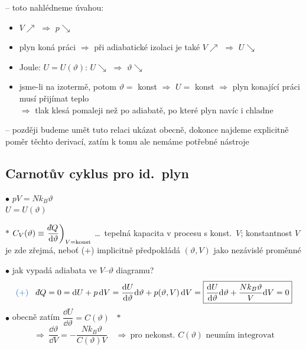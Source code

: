 -- toto nahlédneme úvahou: \quad {}
\begin{itemize}[nosep]
  \item $V\nearrow$ $\Rightarrow$ $p\searrow$
  \item plyn koná práci $\Rightarrow$ při adiabatické izolaci je také $V\nearrow$ $\Rightarrow$ $U\searrow$
  \item Joule: $U = U(\vartheta)$: \quad $U\searrow$ $\Rightarrow$ $\vartheta\searrow$
  \item jsme-li na izotermě, potom $\vartheta = $ konst $\Rightarrow$ $U = $ konst $\Rightarrow$ plyn konající práci musí přijímat teplo \\
        $\Rightarrow$ tlak klesá pomaleji než po adiabatě, po které plyn navíc i chladne
\end{itemize}
-- později budeme umět tuto relaci ukázat obecně, dokonce najdeme explicitně poměr těchto derivací, zatím k tomu ale nemáme potřebné nástroje

\subsection*{Carnotův cyklus pro id.\ plyn}

\begin{minipage}{0.35\textwidth}
$\bullet$ $pV = Nk_B\vartheta$ \\
\hspace*{0.8em} $U = U(\vartheta)$ 
\end{minipage}
\begin{minipage}{0.63\textwidth}
{\color{NavyBlue}\small \textcircled{$*$} $C_V(\vartheta) \equiv \left.\dfrac{\dbar Q}{\dd\vartheta}\right)_{V = \text{konst}}$ \dots\ tepelná kapacita v procesu s konst.\ $V$; konstantnost $V$ je zde zřejmá, neboť (+) implicitně předpokládá $(\vartheta,V)$ jako nezávislé proměnné}
\end{minipage}

$\bullet$ jak vypadá adiabata ve $V$--$\vartheta$ diagramu?
\[
  {\color{NavyBlue}(+)}\quad \dbar Q = 0 = \dd U + p\,\dd V = \frac{\dd U}{\dd\vartheta}\dd\vartheta + p(\vartheta,V)\,\dd V
  = \boxed{\frac{\dd U}{\dd\vartheta}\dd\vartheta + \frac{Nk_B\vartheta}{V}\dd V = 0}
\]
$\bullet$ obecně zatím $\dfrac{\dd U}{\dd\vartheta} = C(\vartheta)$ \ {\color{NavyBlue}\textcircled{$*$}}
\[
  \Rightarrow\ \frac{\dd\vartheta}{\dd V} = -\frac{Nk_B\vartheta}{C(\vartheta)V}
  \quad\Rightarrow\ \text{pro nekonst.\ } C(\vartheta) \text{ neumím integrovat}
\]


